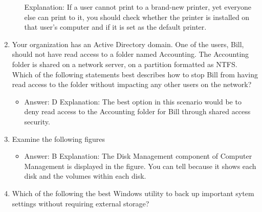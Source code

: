 \documentclass{article}
\begin{document}
\begin{enumerate}
\begin{itemize}
Explanation: If a user cannot print to a brand-new printer, yet everyone else can print
to it, you should check whether the printer is installed on that user’s computer and if it
is set as the default printer.
    \end{itemize}
    \item Your organization has an Active Directory domain. One of the
users, Bill, should not have read access to a folder named
Accounting. The Accounting folder is shared on a network server,
on a partition formatted as NTFS. Which of the following statements
best describes how to stop Bill from having read access to
the folder without impacting any other users on the network?
    \begin{itemize}
        \item Answer: D
Explanation: The best option in this scenario would be to deny read access to the
Accounting folder for Bill through shared access security.
    \end{itemize}
    \item Examine the following figures 
    \begin{itemize}
        \item Answer: B
Explanation: The Disk Management component of Computer Management is displayed
in the figure. You can tell because it shows each disk and the volumes within each
disk.
    \end{itemize}
    \item Which of the following the best Windows utility to back up important sytem settings without requiring external storage? 
    

\end{enumerate}
\end{document}
